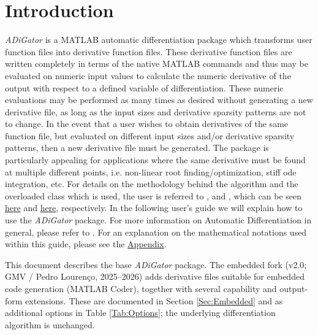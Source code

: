 \documentclass[10pt,pdftex]{article}
\begin{document}
\section{Introduction}
\emph{ADiGator} is a MATLAB automatic differentiation package which transforms user function files into derivative function files. These derivative function files are written completely in terms of the native MATLAB commands and thus may be evaluated on numeric input values to calculate the numeric derivative of the output with respect to a defined variable of differentiation. These numeric evaluations may be performed as many times as desired without generating a new derivative file, as long as the input sizes and derivative sparsity patterns are not to change. In the event that a user wishes to obtain derivatives of the same function file, but evaluated on different input sizes and/or derivative sparsity patterns, then a new derivative file must be generated. The package is particularly appealing for applications where the same derivative must be found at multiple different points, i.e. non-linear root finding/optimization, stiff ode integration, etc. For details on the methodology behind the algorithm and the overloaded class which is used, the user is referred to \cite{Weinstein2014}, and \cite{Patterson2013}, which can be seen \href{http://vdol.mae.ufl.edu/JournalPublications/TOMS-2013-0067.pdf}{here} and \href{http://vdol.mae.ufl.edu/JournalPublications/TOMS-2011-0055.pdf}{here}, respectively.
In the following user's guide we will explain how to use the \emph{ADiGator} package. For more information on Automatic Differentiation in general, please refer to  \cite{Griewank1}. For an explanation on the mathematical notations used within this guide, please see the \hyperlink{Appendix}{Appendix}.

This document describes the base \emph{ADiGator} package. The embedded fork (v2.0; GMV / Pedro Louren\c{c}o, 2025--2026) adds derivative files suitable for embedded code generation (MATLAB Coder), together with several capability and output-form extensions. These are documented in Section \ref{Sec:Embedded} and as additional options in Table \ref{Tab:Options}; the underlying differentiation algorithm is unchanged.
\end{document}
